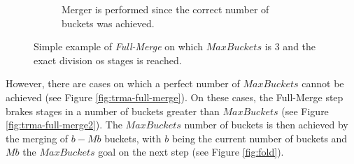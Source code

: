 \begin{figure}[h!]
\begin{subfigure}[t]{0.22\textwidth}
				\caption{Merger is performed since the correct number of buckets was achieved.}
				\label{fig:trma-full-merge-p4}
		\end{subfigure}
		\caption{Simple example of {\em Full-Merge} on which $MaxBuckets$ is 3 and the exact division os stages is reached.}
		\label{fig:trma-full-merge-p}
		\vspace{-3mm}
\end{figure}

However, there are cases on which a perfect number of $MaxBuckets$ cannot be achieved (see Figure \ref{fig:trma-full-merge}). On these cases, the Full-Merge step brakes stages in a number of buckets greater than $MaxBuckets$ (see Figure \ref{fig:trma-full-merge2}). The $MaxBuckets$ number of buckets is then achieved by the merging of $b-Mb$ buckets, with $b$ being the current number of buckets and $Mb$ the $MaxBuckets$ goal on the next step (see Figure \ref{fig:fold}). 

